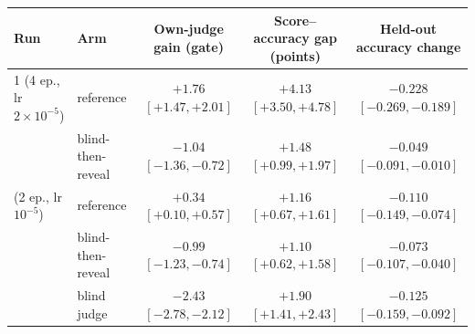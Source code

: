 \begin{tabular}{llccc}
\toprule
Run & Arm & Own-judge gain (gate) & Score--accuracy gap (points) & Held-out accuracy change \\
\midrule
1 (4 ep., lr $2{\times}10^{-5}$) & reference & $+1.76$ {\scriptsize$[+1.47,+2.01]$} & $+4.13$ {\scriptsize$[+3.50,+4.78]$} & $-0.228$ {\scriptsize$[-0.269,-0.189]$} \\
 & blind-then-reveal & $-1.04$ {\scriptsize$[-1.36,-0.72]$} & $+1.48$ {\scriptsize$[+0.99,+1.97]$} & $-0.049$ {\scriptsize$[-0.091,-0.010]$} \\
\addlinespace
3 (2 ep., lr $10^{-5}$) & reference & $+0.34$ {\scriptsize$[+0.10,+0.57]$} & $+1.16$ {\scriptsize$[+0.67,+1.61]$} & $-0.110$ {\scriptsize$[-0.149,-0.074]$} \\
 & blind-then-reveal & $-0.99$ {\scriptsize$[-1.23,-0.74]$} & $+1.10$ {\scriptsize$[+0.62,+1.58]$} & $-0.073$ {\scriptsize$[-0.107,-0.040]$} \\
 & blind judge & $-2.43$ {\scriptsize$[-2.78,-2.12]$} & $+1.90$ {\scriptsize$[+1.41,+2.43]$} & $-0.125$ {\scriptsize$[-0.159,-0.092]$} \\
\bottomrule
\end{tabular}
